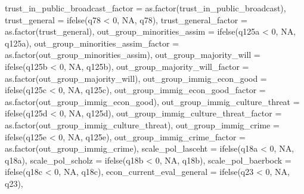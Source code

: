 \documentclass[
]{article}
\newenvironment{Shaded}{\begin{snugshade}}{\end{snugshade}}
\newcommand{\AttributeTok}[1]{\textcolor[rgb]{0.77,0.63,0.00}{#1}}
\newcommand{\ConstantTok}[1]{\textcolor[rgb]{0.00,0.00,0.00}{#1}}
\newcommand{\DecValTok}[1]{\textcolor[rgb]{0.00,0.00,0.81}{#1}}
\newcommand{\FunctionTok}[1]{\textcolor[rgb]{0.00,0.00,0.00}{#1}}
\newcommand{\NormalTok}[1]{#1}
\newcommand{\SpecialCharTok}[1]{\textcolor[rgb]{0.00,0.00,0.00}{#1}}
\begin{document}
\begin{Shaded}
\begin{Highlighting}[]
         \AttributeTok{trust\_in\_public\_broadcast\_factor =} \FunctionTok{as.factor}\NormalTok{(trust\_in\_public\_broadcast),}
         \AttributeTok{trust\_general =} \FunctionTok{ifelse}\NormalTok{(q78 }\SpecialCharTok{\textless{}} \DecValTok{0}\NormalTok{, }\ConstantTok{NA}\NormalTok{, q78),}
         \AttributeTok{trust\_general\_factor =} \FunctionTok{as.factor}\NormalTok{(trust\_general),}
         \AttributeTok{out\_group\_minorities\_assim =} \FunctionTok{ifelse}\NormalTok{(q125a }\SpecialCharTok{\textless{}} \DecValTok{0}\NormalTok{, }\ConstantTok{NA}\NormalTok{, q125a),}
         \AttributeTok{out\_group\_minorities\_assim\_factor =} \FunctionTok{as.factor}\NormalTok{(out\_group\_minorities\_assim),}
         \AttributeTok{out\_group\_majority\_will =} \FunctionTok{ifelse}\NormalTok{(q125b }\SpecialCharTok{\textless{}} \DecValTok{0}\NormalTok{, }\ConstantTok{NA}\NormalTok{, q125b),}
         \AttributeTok{out\_group\_majority\_will\_factor =} \FunctionTok{as.factor}\NormalTok{(out\_group\_majority\_will),}
         \AttributeTok{out\_group\_immig\_econ\_good =} \FunctionTok{ifelse}\NormalTok{(q125c }\SpecialCharTok{\textless{}} \DecValTok{0}\NormalTok{, }\ConstantTok{NA}\NormalTok{, q125c),}
         \AttributeTok{out\_group\_immig\_econ\_good\_factor =} \FunctionTok{as.factor}\NormalTok{(out\_group\_immig\_econ\_good),}
         \AttributeTok{out\_group\_immig\_culture\_threat =} \FunctionTok{ifelse}\NormalTok{(q125d }\SpecialCharTok{\textless{}} \DecValTok{0}\NormalTok{, }\ConstantTok{NA}\NormalTok{, q125d),}
         \AttributeTok{out\_group\_immig\_culture\_threat\_factor =} \FunctionTok{as.factor}\NormalTok{(out\_group\_immig\_culture\_threat),}
         \AttributeTok{out\_group\_immig\_crime =} \FunctionTok{ifelse}\NormalTok{(q125e }\SpecialCharTok{\textless{}} \DecValTok{0}\NormalTok{, }\ConstantTok{NA}\NormalTok{, q125e),}
         \AttributeTok{out\_group\_immig\_crime\_factor =} \FunctionTok{as.factor}\NormalTok{(out\_group\_immig\_crime),}
         \AttributeTok{scale\_pol\_lasceht =} \FunctionTok{ifelse}\NormalTok{(q18a }\SpecialCharTok{\textless{}} \DecValTok{0}\NormalTok{, }\ConstantTok{NA}\NormalTok{, q18a),}
         \AttributeTok{scale\_pol\_scholz =} \FunctionTok{ifelse}\NormalTok{(q18b }\SpecialCharTok{\textless{}} \DecValTok{0}\NormalTok{, }\ConstantTok{NA}\NormalTok{, q18b),}
         \AttributeTok{scale\_pol\_baerbock =} \FunctionTok{ifelse}\NormalTok{(q18c }\SpecialCharTok{\textless{}} \DecValTok{0}\NormalTok{, }\ConstantTok{NA}\NormalTok{, q18c),}
         \AttributeTok{econ\_current\_eval\_general =} \FunctionTok{ifelse}\NormalTok{(q23 }\SpecialCharTok{\textless{}} \DecValTok{0}\NormalTok{, }\ConstantTok{NA}\NormalTok{, q23), }

\end{Highlighting}
\end{Shaded}
\end{document}
